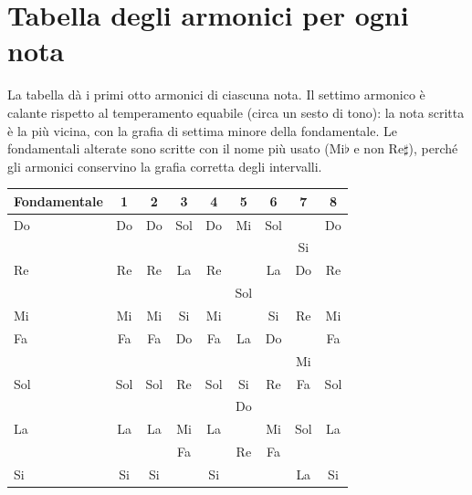 \chapter{Tabella degli armonici per ogni nota}
\label{app:armonici}

La tabella dà i primi otto armonici di ciascuna nota. Il settimo armonico è calante rispetto al temperamento equabile (circa un sesto di tono): la nota scritta è la più vicina, con la grafia di settima minore della fondamentale. Le fondamentali alterate sono scritte con il nome più usato (Mi$\flat$ e non Re$\sharp$), perché gli armonici conservino la grafia corretta degli intervalli.

\begin{center}
\small
\renewcommand{\arraystretch}{1.15}
\begin{tabular}{lcccccccc}
\toprule
\textbf{Fondamentale} & \textbf{1} & \textbf{2} & \textbf{3} & \textbf{4} & \textbf{5} & \textbf{6} & \textbf{7} & \textbf{8} \\
\midrule
Do & Do & Do & Sol & Do & Mi & Sol & \Sibemolle{} & Do \\
\Dodiesis{} & \Dodiesis{} & \Dodiesis{} & \Soldiesis{} & \Dodiesis{} & \Midiesis{} & \Soldiesis{} & Si & \Dodiesis{} \\
Re & Re & Re & La & Re & \Fadiesis{} & La & Do & Re \\
\Mibemolle{} & \Mibemolle{} & \Mibemolle{} & \Sibemolle{} & \Mibemolle{} & Sol & \Sibemolle{} & \Rebemolle{} & \Mibemolle{} \\
Mi & Mi & Mi & Si & Mi & \Soldiesis{} & Si & Re & Mi \\
Fa & Fa & Fa & Do & Fa & La & Do & \Mibemolle{} & Fa \\
\Fadiesis{} & \Fadiesis{} & \Fadiesis{} & \Dodiesis{} & \Fadiesis{} & \Ladiesis{} & \Dodiesis{} & Mi & \Fadiesis{} \\
Sol & Sol & Sol & Re & Sol & Si & Re & Fa & Sol \\
\Labemolle{} & \Labemolle{} & \Labemolle{} & \Mibemolle{} & \Labemolle{} & Do & \Mibemolle{} & \Solbemolle{} & \Labemolle{} \\
La & La & La & Mi & La & \Dodiesis{} & Mi & Sol & La \\
\Sibemolle{} & \Sibemolle{} & \Sibemolle{} & Fa & \Sibemolle{} & Re & Fa & \Labemolle{} & \Sibemolle{} \\
Si & Si & Si & \Fadiesis{} & Si & \Rediesis{} & \Fadiesis{} & La & Si \\
\bottomrule
\end{tabular}
\end{center}

